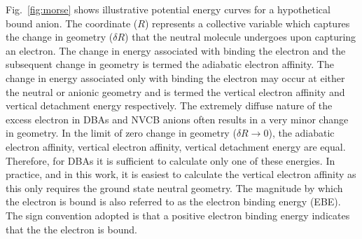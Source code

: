 Fig.~\ref{fig:morse} shows illustrative potential energy curves for a hypothetical bound anion.
The coordinate ($R$) represents a collective variable which captures the change in geometry ($\delta R$) that the neutral molecule undergoes upon capturing an electron.
The change in energy associated with binding the electron and the subsequent change in geometry is termed the adiabatic electron affinity.
The change in energy associated only with binding the electron may occur at either the neutral or anionic geometry and is termed the vertical electron affinity and vertical detachment energy respectively.
The extremely diffuse nature of the excess electron in DBAs and NVCB anions often results in a very minor change in geometry.
In the limit of zero change in geometry ($\delta R \rightarrow 0$), the adiabatic electron affinity, vertical electron affinity, vertical detachment energy are equal.
Therefore, for DBAs it is sufficient to calculate only one of these energies.
In practice, and in this work, it is easiest to calculate the vertical electron affinity as this only requires the ground state neutral geometry.
The magnitude by which the electron is bound is also referred to as the electron binding energy (EBE).
The sign convention adopted is that a positive electron binding energy indicates that the the electron is bound.
